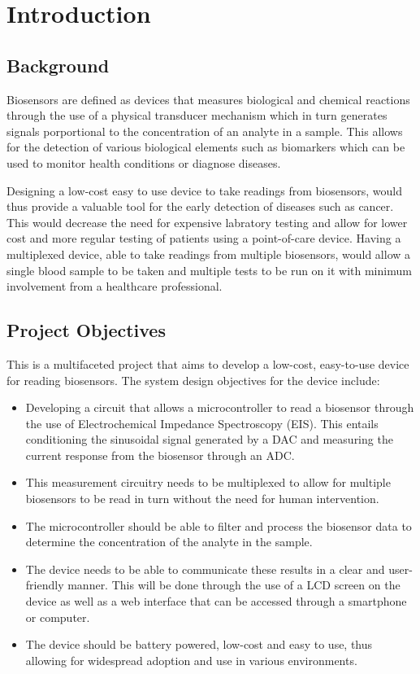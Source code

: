 \graphicspath{{introduction/fig/}}

\chapter{Introduction}
\label{chap:introduction}

\section{Background}

Biosensors are defined as devices that measures biological and chemical reactions through the use of a physical transducer 
mechanism which in turn generates signals porportional to the concentration of an analyte in a sample.\cite{bhallaIntroductionBiosensors2016} This allows for the detection of various biological elements such as biomarkers which can be used to monitor health conditions or diagnose diseases.

Designing a low-cost easy to use device to take readings from biosensors, would thus provide a valuable tool for the early detection of diseases such as cancer. 
This would decrease the need for expensive labratory testing and allow for lower cost and more regular testing of patients using a point-of-care device.
Having a multiplexed device, able to take readings from multiple biosensors, would allow a single blood sample to be taken and multiple tests to be run on it with minimum involvement from a healthcare professional.

\section{Project Objectives}
This is a multifaceted project that aims to develop a low-cost, easy-to-use device for reading biosensors. The system design objectives for the device include:
\begin{itemize}
    \item Developing a circuit that allows a microcontroller to read a biosensor through the use of Electrochemical Impedance Spectroscopy (EIS). 
    This entails conditioning the sinusoidal signal generated by a DAC and measuring the current response from the biosensor through an ADC.
    \item This measurement circuitry needs to be multiplexed to allow for multiple biosensors to be read in turn without the need for human intervention.
    \item The microcontroller should be able to filter and process the biosensor data to determine the concentration of the analyte in the sample.
    \item The device needs to be able to communicate these results in a clear and user-friendly manner. 
This will be done through the use of a LCD screen on the device as well as a web interface that can be accessed through a smartphone or computer.
    \item The device should be battery powered, low-cost and easy to use, thus allowing for widespread adoption and use in various environments.
\end{itemize}
